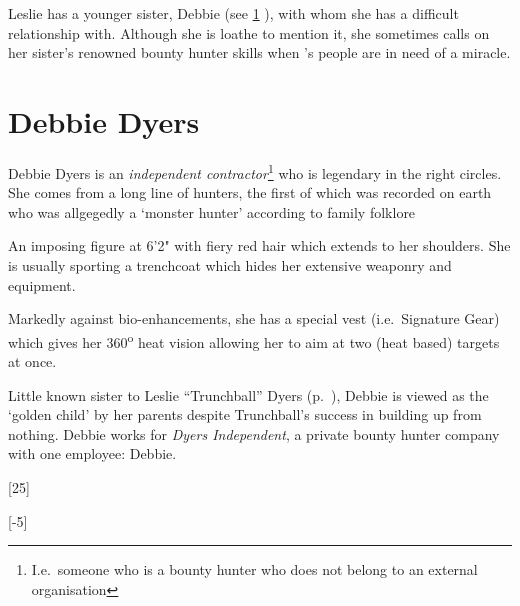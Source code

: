 Leslie has a younger sister, Debbie (see \ref{sec:debbie-dyers}
), with whom she has a difficult relationship with. Although she is loathe to
mention it, she sometimes calls on her sister's renowned bounty hunter skills
when \thecompany's people are in need of a miracle.

\begin{character}
     

\end{character}

\section{Debbie Dyers}
\label{sec:debbie-dyers}

Debbie Dyers is an \emph{independent contractor}\footnote{I.e.~someone who is a
  bounty hunter who does not belong to an external organisation} who is
legendary in the right circles. She comes from a long line of hunters, the first
of which was recorded on earth who was allgegedly a `monster hunter' according
to family folklore

An imposing figure at 6'2" with fiery red hair which extends to her shoulders.
She is usually sporting a trenchcoat which hides her extensive weaponry and
equipment.

Markedly against bio-enhancements, she has a special vest (i.e.~Signature Gear)
which gives her 360\textsuperscript{o} heat vision allowing her to aim at
two (heat based) targets at once.

Little known sister to Leslie ``Trunchball'' Dyers
(p.~\pageref{sec:lesl-trunchb-dyers}), Debbie is viewed as the `golden child' by her
parents despite Trunchball's success in building \thecompany up from nothing.
Debbie works for \emph{Dyers Independent}, a private bounty hunter company with
one employee: Debbie.

\begin{character}
     


  [25]

  [-5]

\end{character}


